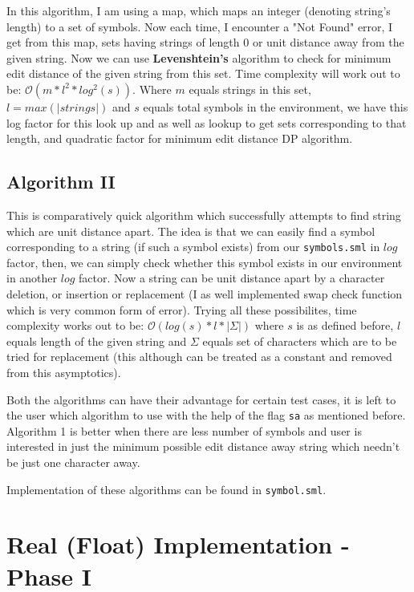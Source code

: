In this algorithm, I am using a map, which maps an integer (denoting string's length) to a set of symbols. Now each time, I encounter a "Not Found" error, I get from this map, sets having strings of length 0 or unit distance away from the given string. Now we can use \textbf{Levenshtein's} algorithm to check for minimum edit distance of the given string from this set. Time complexity will work out to be: $\mathcal{O}(m * l^2 * log^2(s))$. Where $m$ equals strings in this set, $l = max(|strings|)$ and $s$ equals total symbols in the environment, we have this log factor for this look up and as well as lookup to get sets corresponding to that length, and quadratic factor for minimum edit distance DP algorithm.

\subsection{Algorithm II}

This is comparatively quick algorithm which successfully attempts to find string which are unit distance apart. The idea is that we can easily find a symbol corresponding to a string (if such a symbol exists) from our \texttt{symbols.sml} in $log$ factor, then, we can simply check whether this symbol exists in our environment in another $log$ factor. Now a string can be unit distance apart by a character deletion, or insertion or replacement (I as well implemented swap check function which is very common form of error). Trying all these possibilites, time complexity works out to be: $\mathcal{O}(log(s) * l * |\Sigma|)$ where $s$ is as defined before, $l$ equals length of the given string and $\Sigma$ equals set of characters which are to be tried for replacement (this although can be treated as a constant and removed from this asymptotics).

Both the algorithms can have their advantage for certain test cases, it is left to the user which algorithm to use with the help of the flag \texttt{sa} as mentioned before. Algorithm 1 is better when there are less number of symbols and user is interested in just the minimum possible edit distance away string which needn't be just one character away.

Implementation of these algorithms can be found in \texttt{symbol.sml}.

\section{Real (Float) Implementation - Phase I}

